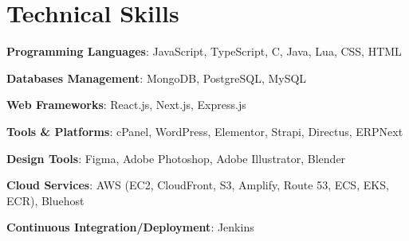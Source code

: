 \section{Technical Skills}
 \begin{itemize}[leftmargin=0.15in, label={}, itemsep=-0.04in]
    \small{
        \item \textbf{Programming Languages}: JavaScript, TypeScript, C, Java, Lua, CSS, HTML
        \item \textbf{Databases Management}: MongoDB, PostgreSQL, MySQL
        \item \textbf{Web Frameworks}: React.js, Next.js, Express.js
        \item \textbf{Tools \& Platforms}:  cPanel, WordPress, Elementor, Strapi, Directus, ERPNext
        \item \textbf{Design Tools}: Figma, Adobe Photoshop, Adobe Illustrator, Blender
        \item \textbf{Cloud Services}: AWS (EC2, CloudFront, S3, Amplify, Route 53, ECS, EKS, ECR), Bluehost
        \item \textbf{Continuous Integration/Deployment}: Jenkins
    }
 \end{itemize}
